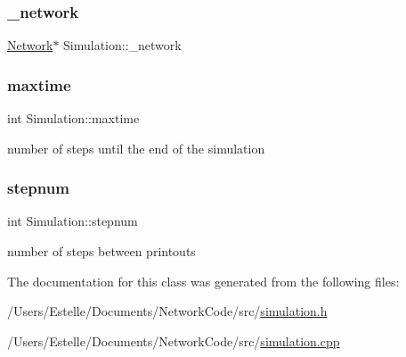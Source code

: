 \subsubsection{\texorpdfstring{\+\_\+network}{\_network}}
{\footnotesize\ttfamily \mbox{\hyperlink{classNetwork}{Network}}$\ast$ Simulation\+::\+\_\+network\hspace{0.3cm}{\ttfamily [private]}}

\mbox{\label{classSimulation_a2db45338d73f8e7823eb85015532be23}} 
\subsubsection{\texorpdfstring{maxtime}{maxtime}}
{\footnotesize\ttfamily int Simulation\+::maxtime\hspace{0.3cm}{\ttfamily [private]}}

number of steps until the end of the simulation \mbox{\label{classSimulation_a6bfba2071d6358af042ca417637c6c36}} 
\subsubsection{\texorpdfstring{stepnum}{stepnum}}
{\footnotesize\ttfamily int Simulation\+::stepnum\hspace{0.3cm}{\ttfamily [private]}}

number of steps between printouts 

The documentation for this class was generated from the following files\+:\begin{DoxyCompactItemize}
\item 
/\+Users/\+Estelle/\+Documents/\+Network\+Code/src/\mbox{\hyperlink{simulation_8h}{simulation.\+h}}\item 
/\+Users/\+Estelle/\+Documents/\+Network\+Code/src/\mbox{\hyperlink{simulation_8cpp}{simulation.\+cpp}}\end{DoxyCompactItemize}
